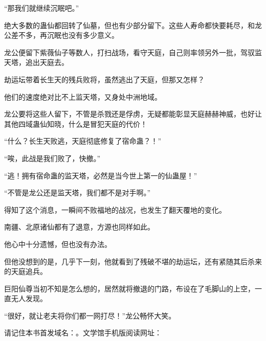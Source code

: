 \begin{this_body}
“那我们就继续沉眠吧。”

绝大多数的蛊仙都回转了仙墓，但也有少部分留下。这些人寿命都快要耗尽，和龙公差不多，再沉眠也没有多少意义。

龙公便留下紫薇仙子等数人，打扫战场，看守天庭，自己则率领另外一批，驾驭监天塔，追出天庭去。

劫运坛带着长生天的残兵败将，虽然逃出了天庭，但那又怎样？

他们的速度绝对比不上监天塔，又身处中洲地域。

龙公要将这些人留下，不管是杀戮还是俘虏，无疑都能彰显天庭赫赫神威，也好让其他四域蛊仙知晓，什么是冒犯天庭的代价！

“什么？长生天败逃，天庭彻底修复了宿命蛊？！”

“唉，此战是我们败了，快撤。”

“逃！拥有宿命蛊的监天塔，必然是当今世上第一的仙蛊屋！”

“不管是龙公还是监天塔，我们都不是对手啊。”

得知了这个消息，一瞬间不败福地的战况，也发生了翻天覆地的变化。

南疆、北原诸仙都有了退意，方源也同样如此。

他心中十分遗憾，但也没有办法。

但他没想到的是，几乎下一刻，他就看到了残破不堪的劫运坛，还有紧随其后杀来的天庭追兵。

巨阳仙尊当初不知是怎么想的，居然就将撤退的门路，布设在了毛脚山的上空，一直无人发现。

“很好，就让老夫将你们都一网打尽！”龙公畅怀大笑。

请记住本书首发域名：。文学馆手机版阅读网址：

\end{this_body}

